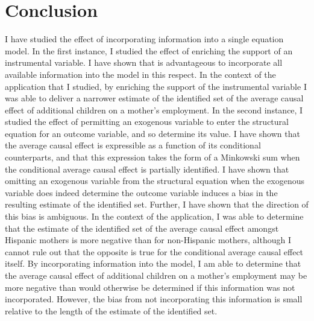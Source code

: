 \documentclass[12pt,a4paper,twoside]{article}
\numberwithin{equation}{section}
\begin{document}
\section{Conclusion}
I have studied the effect of incorporating information into a single equation model. In the first instance, I studied the effect of enriching the support of an instrumental variable. I have shown that is advantageous to incorporate all available information into the model in this respect. In the context of the application that I studied, by enriching the support of the instrumental variable I was able to deliver a narrower estimate of the identified set of the average causal effect of additional children on a mother's employment. In the second instance, I studied the effect of permitting an exogenous variable to enter the structural equation for an outcome variable, and so determine its value. I have shown that the average causal effect is expressible as a function of its conditional counterparts, and that this expression takes the form of a Minkowski sum when the conditional average causal effect is partially identified. I have shown that omitting an exogenous variable from the structural equation when the exogenous variable does indeed determine the outcome variable induces a bias in the resulting estimate of the identified set. Further, I have shown that the direction of this bias is ambiguous. In the context of the application, I was able to determine that the estimate of the identified set of the average causal effect amongst Hispanic mothers is more negative than for non-Hispanic mothers, although I cannot rule out that the opposite is true for the conditional average causal effect itself. By incorporating information into the model, I am able to determine that the average causal effect of additional children on a mother's employment may be more negative than would otherwise be determined if this information was not incorporated. However, the bias from not incorporating this information is small relative to the length of the estimate of the identified set. 
\end{document}
